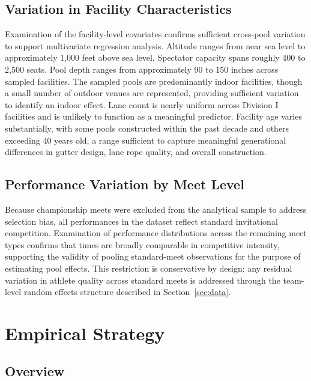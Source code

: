 \documentclass[12pt]{article}
\begin{document}
\subsection{Variation in Facility Characteristics}

Examination of the facility-level covariates confirms sufficient cross-pool
variation to support multivariate regression analysis. Altitude ranges from near
sea level to approximately 1,000 feet above sea level. Spectator capacity spans
roughly 400 to 2,500 seats. Pool depth ranges from approximately 90 to 150
inches across sampled facilities. The sampled pools are predominantly indoor
facilities, though a small number of outdoor venues are represented, providing
sufficient variation to identify an indoor effect. Lane count is nearly uniform
across Division I facilities and is unlikely to function as a meaningful
predictor. Facility age varies substantially, with some pools constructed within
the past decade and others exceeding 40 years old, a range sufficient to capture
meaningful generational differences in gutter design, lane rope quality, and
overall construction.

\subsection{Performance Variation by Meet Level}

Because championship meets were excluded from the analytical sample to address
selection bias, all performances in the dataset reflect standard invitational
competition. Examination of performance distributions across the remaining meet
types confirms that times are broadly comparable in competitive intensity,
supporting the validity of pooling standard-meet observations for the purpose
of estimating pool effects. This restriction is conservative by design: any
residual variation in athlete quality across standard meets is addressed through
the team-level random effects structure described in Section~\ref{sec:data}.

\section{Empirical Strategy}

\subsection{Overview}
\end{document}
